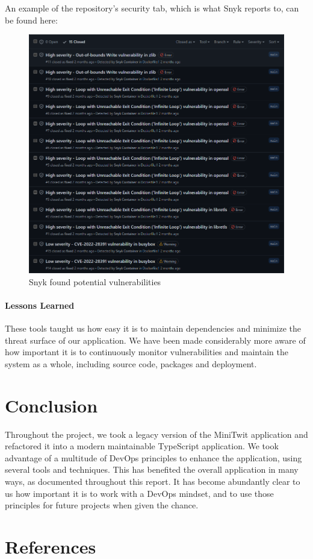 \documentclass{article}
\begin{document}
An example of the repository's security tab, which is what Snyk reports to, can be found here:
\begin{figure}[H]
    \centering
    \includegraphics[scale=0.40]{images/snyk.png}
    \caption{Snyk found potential vulnerabilities}
\end{figure}

\paragraph{Lessons Learned}
These tools taught us how easy it is to maintain dependencies and minimize the threat surface of our application. We have been made considerably more aware of how important it is to continuously monitor vulnerabilities and maintain the system as a whole, including source code, packages and deployment.

\section{Conclusion}
Throughout the project, we took a legacy version of the MiniTwit application and refactored it into a modern maintainable TypeScript application. We took advantage of a multitude of DevOps principles to enhance the application, using several tools and techniques. This has benefited the overall application in many ways, as documented throughout this report. It has become abundantly clear to us how important it is to work with a DevOps mindset, and to use those principles for future projects when given the chance.

\newpage
\section{References}
\printbibliography[heading=none]
\end{document}

